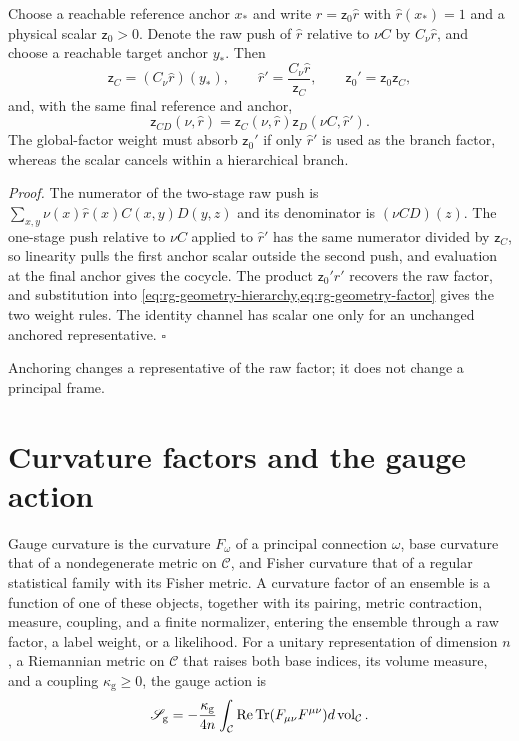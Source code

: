 Choose a reachable reference anchor $x_*$ and write $r=\mathsf z_0\widehat r$
with $\widehat r(x_*)=1$ and a physical scalar $\mathsf z_0>0$. Denote the raw
push of $\widehat r$ relative to $\nu C$ by $C_\nu\widehat r$, and choose a
reachable target anchor $y_*$. Then
\begin{equation}
 \mathsf z_C=(C_\nu\widehat r)(y_*),\qquad
 \widehat r'=\frac{C_\nu\widehat r}{\mathsf z_C},\qquad
 \mathsf z_0'=\mathsf z_0\mathsf z_C,
 \label{eq:rg-geometry-anchor}
\end{equation}
and, with the same final reference and anchor,
\begin{equation}
 \mathsf z_{CD}(\nu,\widehat r)
 =\mathsf z_C(\nu,\widehat r)
   \mathsf z_D(\nu C,\widehat r').
 \label{eq:rg-geometry-scalar-cocycle}
\end{equation}
The global-factor weight must absorb $\mathsf z_0'$ if only $\widehat r'$ is used
as the branch factor, whereas the scalar cancels within a hierarchical
branch. 

\noindent\emph{Proof.}
The numerator of the two-stage raw push is
$\sum_{x,y}\nu(x)\widehat r(x)C(x,y)D(y,z)$ and its denominator is
$(\nu CD)(z)$. The one-stage push relative to $\nu C$ applied to
$\widehat r'$ has the same numerator divided by $\mathsf z_C$, so linearity
pulls the first anchor scalar outside the second push, and evaluation at the
final anchor gives the cocycle. The product $\mathsf z_0'\widehat r'$ recovers
the raw factor, and substitution into
\cref{eq:rg-geometry-hierarchy,eq:rg-geometry-factor} gives the two weight
rules. The identity channel has scalar one only for an unchanged anchored
representative. $\square$

Anchoring changes a representative of the raw factor; it does not change a
principal frame.

\section{Curvature factors and the gauge action}
\label{sec:rg-geometry-curvatures}

Gauge curvature is the curvature $F_\omega$ of a principal connection $\omega$,
base curvature that of a nondegenerate metric on $\mathcal C$, and Fisher
curvature that of a regular statistical family with its Fisher metric. A
curvature factor of an ensemble is a function of one of these objects,
together with its pairing, metric contraction, measure, coupling, and a
finite normalizer, entering the ensemble through a raw factor, a label
weight, or a likelihood. For a unitary representation of dimension $n$, a
Riemannian metric on $\mathcal C$ that raises both base indices, its volume
measure, and a coupling $\kappa_{\mathrm g}\geq0$, the gauge action is
\begin{equation}
 \mathscr S_{\mathrm g}=
 -\frac{\kappa_{\mathrm g}}{4n}\int_{\mathcal C}
 \operatorname{Re}\operatorname{Tr}(F_{\mu\nu}F^{\mu\nu})d\operatorname{vol}_{\mathcal C}.
 \label{eq:rg-geometry-gauge-action}
\end{equation}

